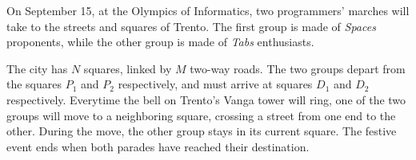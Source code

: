 \usepackage{xcolor}
\usepackage{afterpage}
\usepackage{pifont,mdframed}
\usepackage[bottom]{footmisc}



\renewcommand{\inputfile}{\texttt{stdin}}
\renewcommand{\outputfile}{\texttt{stdout}}
\makeatletter
\renewcommand{\this@inputfilename}{\texttt{stdin}}
\renewcommand{\this@outputfilename}{\texttt{stdout}}
\makeatother

\newenvironment{warning}
  {\par\begin{mdframed}[linewidth=2pt,linecolor=gray]%
    \begin{list}{}{\leftmargin=1cm
                   \labelwidth=\leftmargin}\item[\Large\ding{43}]}
  {\end{list}\end{mdframed}\par}

\newenvironment{todoenv}
{\par\begin{mdframed}[linewidth=2pt,linecolor=red]%
		\begin{list}{}{\leftmargin=1cm
				\labelwidth=\leftmargin}\item[\Large\ding{169}]}
		{\end{list}\end{mdframed}\par}

\newcommand{\todo}[1]{\begin{todoenv}
		TODO: #1
\end{todoenv}}


On September 15, at the Olympics of Informatics, two programmers' marches will take to the streets and squares of Trento. The first group is made of \emph{Spaces} proponents, while the other group is made of \emph{Tabs} enthusiasts.

The city has $N$ squares, linked by $M$ two-way roads. The two groups depart from the squares $P_1$ and $P_2$ respectively, and must arrive at squares $D_1$ and $D_2$ respectively. Everytime the bell on Trento's Vanga tower will ring, one of the two groups will move to a neighboring square, crossing a street from one end to the other. During the move, the other group stays in its current square. The festive event ends when both parades have reached their destination.

